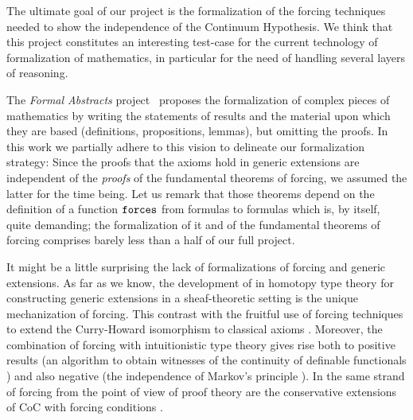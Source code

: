 The
ultimate goal of our project is the formalization of the forcing
techniques needed to show the independence of the Continuum
Hypothesis. 
We think that this project constitutes an interesting test-case
for the current technology of formalization of mathematics, in
particular for the need of handling several layers of reasoning. 

The \emph{Formal Abstracts} project~\cite{hales-fabstracts} proposes
the formalization of complex pieces of mathematics by writing the
statements of 
results and the material upon which they are based (definitions,
propositions, lemmas), but omitting the proofs. In this work we
partially adhere to this vision to delineate our formalization
strategy:
Since the proofs that the  axioms hold in generic extensions
are independent of the \emph{proofs} of the fundamental theorems of
forcing, we assumed the latter for the time being. Let us remark
that those theorems depend on the definition of a function $\mathop{\mathtt{forces}}$
from formulas to formulas which is, by itself, quite demanding; the
formalization of it and of the fundamental theorems of forcing %
comprises barely less than a half of our full project.

It might be a little surprising the lack of formalizations of forcing
and generic extensions. As far as we know, the development of
\citet{JFR6232} in homotopy type theory for constructing generic
extensions in a sheaf-theoretic setting is the unique mechanization of
forcing. This contrast with the fruitful use of forcing techniques to
extend the Curry-Howard isomorphism to classical axioms
\cite{Miquel:2011:FPT:2058525.2059614,lmcs:1070}. Moreover, the
combination of forcing with intuitionistic type theory
\cite{Coquand:2009:FTT:1807662.1807665,coquand2010note} gives rise
both to positive results (an algorithm to obtain witnesses of the
continuity of definable functionals \cite{coquand2012computational})
and also negative (the independence of Markov's principle
\cite{lmcs:3859}). In the same strand of forcing from the point of
view of proof theory \cite{avigad_2004} are the conservative
extensions of CoC with forcing conditions
\cite{jaber:hal-01319066,Jaber:2012:ETT:2358958.2359524}.


